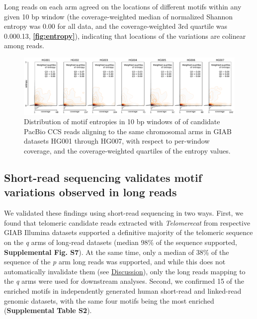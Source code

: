 \documentclass{article}
\begin{document}
    \noindent %
    Long reads on each arm agreed on the locations of different motifs within any given 10 bp window
        (the coverage-weighted median of normalized Shannon entropy was 0.00 for all data,
        and the coverage-weighted 3rd quartile was 0.00\textendash{}0.13,
        \textbf{\autoref{fig:entropy}}),
        indicating that locations of the variations are colinear among reads.
        \begin{figure}[h!] \centering
        \includegraphics[height=.75\textheight,width=\textwidth,keepaspectratio]{renders/figures/Figure-3.pdf}
        \caption{
            \small Distribution of motif entropies in 10 bp windows of of candidate PacBio CCS reads aligning to the same chromosomal arms
            in GIAB datasets HG001 through HG007,
            with respect to per-window coverage,
            and the coverage-weighted quartiles of the entropy values.
        }
        \label{fig:entropy}
        \end{figure}

\subsection*{Short-read sequencing validates motif variations observed in long reads}
    We validated these findings using short-read sequencing in two ways.
    First, we found that telomeric candidate reads extracted with \textit{Telomerecat} \cite{telomerecat}
        from respective GIAB Illumina datasets
        supported a definitive majority of the telomeric sequence on the \textit{q} arms of long-read datasets
            (median 98\% of the sequence supported, \textbf{Supplemental Fig. S7}).
        At the same time, only a median of 38\% of the sequence of the \textit{p} arm long reads was supported,
            and while this does not automatically invalidate them (see \hyperref[sec:discussion]{Discussion}),
            only the long reads mapping to the \textit{q} arms were used for downstream analyses.
    Second, we confirmed 15 of the enriched motifs in independently generated human short-read and linked-read genomic datasets,
        with the same four motifs being the most enriched (\textbf{Supplemental Table S2}).
\end{document}
